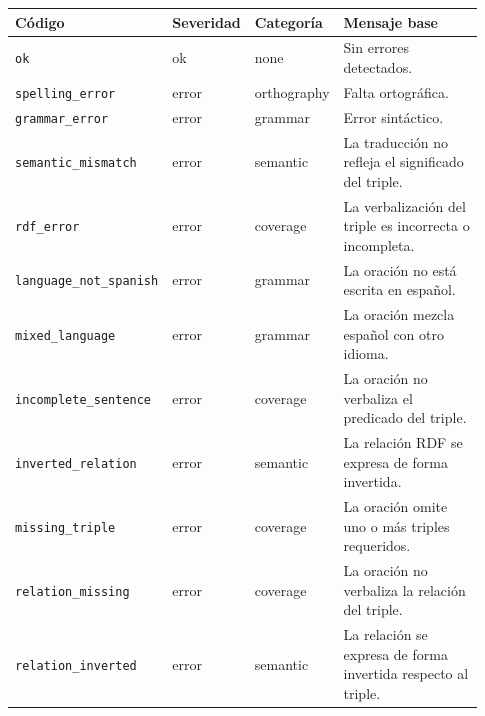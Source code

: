 \begin{longtable}{|p{0.26\linewidth}|p{0.13\linewidth}|p{0.18\linewidth}|p{0.36\linewidth}|}
	\hline
	\textbf{Código}                  & \textbf{Severidad} & \textbf{Categoría} & \textbf{Mensaje base}                                         \\
	\hline
	\endhead
	\texttt{ok}                      & ok                 & none               & Sin errores detectados.                                       \\ \hline
	\texttt{spelling\_error}         & error              & orthography        & Falta ortográfica.                                            \\ \hline
	\texttt{grammar\_error}          & error              & grammar            & Error sintáctico.                                             \\ \hline
	\texttt{semantic\_mismatch}      & error              & semantic           & La traducción no refleja el significado del triple.           \\ \hline
	\texttt{rdf\_error}              & error              & coverage           & La verbalización del triple es incorrecta o incompleta.       \\ \hline
	\texttt{language\_not\_spanish}  & error              & grammar            & La oración no está escrita en español.                        \\ \hline
	\texttt{mixed\_language}         & error              & grammar            & La oración mezcla español con otro idioma.                    \\ \hline
	\texttt{incomplete\_sentence}    & error              & coverage           & La oración no verbaliza el predicado del triple.              \\ \hline
	\texttt{inverted\_relation}      & error              & semantic           & La relación RDF se expresa de forma invertida.                \\ \hline
	\texttt{missing\_triple}         & error              & coverage           & La oración omite uno o más triples requeridos.                \\ \hline
	\texttt{relation\_missing}       & error              & coverage           & La oración no verbaliza la relación del triple.               \\ \hline
	\texttt{relation\_inverted}      & error              & semantic           & La relación se expresa de forma invertida respecto al triple. \\ \hline

\end{longtable}

